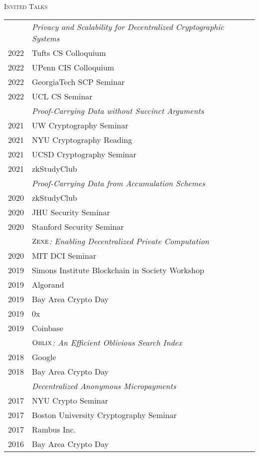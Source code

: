 \documentclass[11pt]{article}
\newenvironment{SectionTableSingleSpace}[1]{
	\renewcommand*{\arraystretch}{1.2}
	\setlength{\tabcolsep}{6pt}
  {\Large \textsc{#1}}
	\begin{longtable}{Rp{5.4in}}}
{\end{longtable}\vspace{-0.2cm}}
\begin{document}
\begin{cv}{\vspace{-5em}}
\begin{SectionTableSingleSpace}{Invited Talks}
    & \emph{Privacy and Scalability for Decentralized Cryptographic Systems}\\
    2022 & Tufts CS Colloquium\\
    2022 & UPenn CIS Colloquium\\
    2022 & GeorgiaTech SCP Seminar\\
    2022 & UCL CS Seminar\\[0.4em]

    & \emph{Proof-Carrying Data without Succinct Arguments} \\
    2021 & UW Cryptography Seminar\\
    2021 & NYU Cryptography Reading\\
    2021 & UCSD Cryptography Seminar\\
    2021 & zkStudyClub\\[0.4em]
    
    
    & \emph{Proof-Carrying Data from Accumulation Schemes} \\
    2020 &  zkStudyClub \\
    2020 &  JHU Security Seminar \\
    2020 &  Stanford Security Seminar \\[0.4em]
    
    
    & \emph{$\textsc{Zexe}$: Enabling Decentralized Private Computation} \\
      2020 & MIT DCI Seminar \\
      2019 & Simons Institute Blockchain in Society Workshop \\
      2019 & Algorand \\
      2019 & Bay Area Crypto Day \\
      2019 & 0x \\
      2019 & Coinbase \\[0.4em]

    & \emph{$\textsc{Oblix}$: An Efficient Oblivious Search Index} \\
      2018 & Google \\
      2018 & Bay Area Crypto Day \\[0.4em]
      
      
    & \emph{Decentralized Anonymous Micropayments} \\
      2017 & NYU Crypto Seminar \\
      2017 & Boston University Cryptography Seminar \\
      2017 & Rambus Inc. \\
      2016 & Bay Area Crypto Day 
    

\end{SectionTableSingleSpace}
\end{cv}
\end{document}
